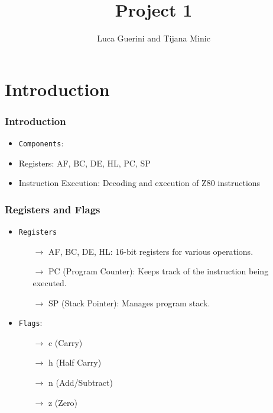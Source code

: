 \documentclass{beamer}
\newcommand{\arrow}{\(\rightarrow\)}
\begin{document}
\title{Project 1}
\author{Luca Guerini and Tijana Minic}
\date{}

\begin{frame}
\titlepage
\end{frame}

\section{Introduction}

\begin{frame}[fragile]
\frametitle{Introduction}
\begin{itemize}
\item<1-> \texttt{Components}:
\item<2-> Registers: AF, BC, DE, HL, PC, SP
\item<3-> Instruction Execution: Decoding and execution of Z80 instructions
\end{itemize}

\end{frame}

\begin{frame}[fragile]
\frametitle{Registers and Flags}
\begin{itemize}
\item<1-> \texttt{Registers}
\begin{itemize}
\item[\arrow] AF, BC, DE, HL: 16-bit registers for various operations.

\item[\arrow]  PC (Program Counter): Keeps track of the instruction being executed.

\item[\arrow] SP (Stack Pointer): Manages program stack.

\end{itemize}

\item<2->\texttt{Flags}:
\begin{itemize}
\item[\arrow] c (Carry)

\item[\arrow]  h (Half Carry)
\item[\arrow] n (Add/Subtract)
\item[\arrow] z (Zero)

\end{itemize}
\end{itemize}
\end{frame}
\end{document}
